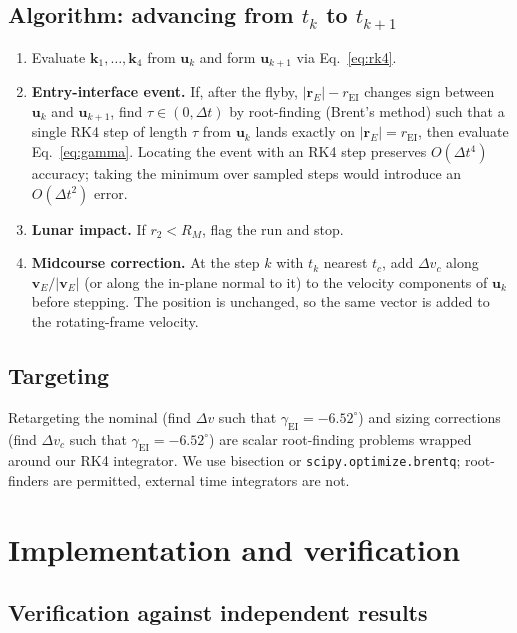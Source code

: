 \documentclass[11pt]{article}
\newcommand{\rE}{\mathbf{r}_E}
\newcommand{\vE}{\mathbf{v}_E}
\newcommand{\gEI}{\gamma_{\mathrm{EI}}}
\newcommand{\bu}{\mathbf{u}}
\begin{document}
\subsection{Algorithm: advancing from $t_k$ to $t_{k+1}$}

\begin{enumerate}[leftmargin=2em]
  \item Evaluate $\mathbf{k}_1,\dots,\mathbf{k}_4$ from $\bu_k$ and form $\bu_{k+1}$ via Eq.~\eqref{eq:rk4}.
  \item \textbf{Entry-interface event.} If, after the flyby, $|\rE| - r_{\mathrm{EI}}$ changes sign between $\bu_k$ and $\bu_{k+1}$, find $\tau \in (0, \Delta t)$ by root-finding (Brent's method) such that a single RK4 step of length $\tau$ from $\bu_k$ lands exactly on $|\rE| = r_{\mathrm{EI}}$, then evaluate Eq.~\eqref{eq:gamma}. Locating the event with an RK4 step preserves $O(\Delta t^4)$ accuracy; taking the minimum over sampled steps would introduce an $O(\Delta t^2)$ error.
  \item \textbf{Lunar impact.} If $r_2 < R_M$, flag the run and stop.
  \item \textbf{Midcourse correction.} At the step $k$ with $t_k$ nearest $t_c$, add $\Delta v_c$ along $\vE/|\vE|$ (or along the in-plane normal to it) to the velocity components of $\bu_k$ before stepping. The position is unchanged, so the same vector is added to the rotating-frame velocity.
\end{enumerate}

\subsection{Targeting}

Retargeting the nominal (find $\Delta v$ such that $\gEI = -6.52^\circ$) and sizing corrections (find $\Delta v_c$ such that $\gEI = -6.52^\circ$) are scalar root-finding problems wrapped around our RK4 integrator. We use bisection or \texttt{scipy.optimize.brentq}; root-finders are permitted, external time integrators are not.

\section{Implementation and verification}
\label{sec:verification}

\subsection{Verification against independent results}
\end{document}
